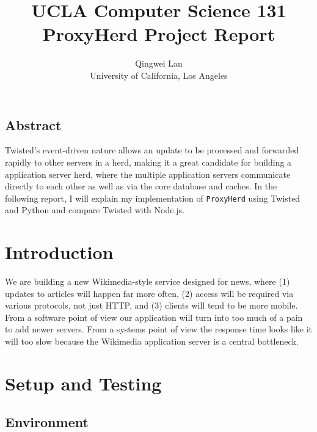 \documentclass[letterpaper,twocolumn,10pt]{article}
\begin{document}
\date{}

\title{\Large \bf UCLA Computer Science 131 ProxyHerd Project Report}

\author{
{\rm Qingwei Lan}\\
University of California, Los Angeles
} %

\maketitle

\thispagestyle{empty}


\subsection*{Abstract}
Twisted's event-driven nature allows an update to be processed and forwarded rapidly to other servers in a herd, making it a great candidate for building a application server herd, where the multiple application servers communicate directly to each other as well as via the core database and caches. In the following report, I will explain my implementation of {\tt ProxyHerd} using Twisted and Python and compare Twisted with Node.js.

\section{Introduction}

We are building a new Wikimedia-style service designed for news, where (1) updates to articles will happen far more often, (2) access will be required via various protocols, not just HTTP, and (3) clients will tend to be more mobile. From a software point of view our application will turn into too much of a pain to add newer servers. From a systems point of view the response time looks like it will too slow because the Wikimedia application server is a central bottleneck.

\section{Setup and Testing}

\subsection{Environment}
\end{document}
